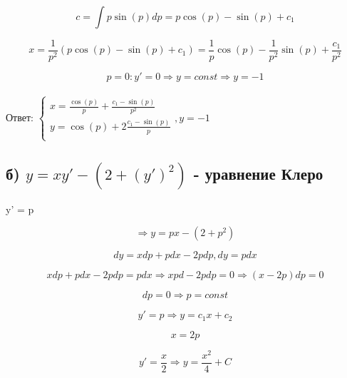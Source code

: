 \documentclass{article}
\begin{document}
\begin{equation*}
    c = \int{p\sin{(p)}dp} = p\cos{(p)} - \sin{(p)} + c_1
\end{equation*}

\begin{equation*}
    x = \frac{1}{p^2}(p\cos{(p)} - \sin{(p)} + c_1) = \frac{1}{p}\cos{(p)} - \frac{1}{p^2}\sin{(p)} + \frac{c_1}{p^2}
\end{equation*}

\begin{equation*}
    p = 0: y' = 0 \Rightarrow y = const \Rightarrow y = -1
\end{equation*}
\\
Ответ:
$
    \begin{cases}
    x = \frac{\cos{(p)}}{p} + \frac{c_1 - \sin{(p)}}{p^2} \\
    y = \cos{(p)} + 2\frac{c_1 - \sin{(p)}}{p} \\
    \end{cases} , y = -1
$
\subsection*{б) $y = xy' - (2 + (y')^2)$ - уравнение Клеро} 

   y' = p 

\begin{equation*}
   \Rightarrow  y = px - (2 + p^2)
\end{equation*}

\begin{equation*}
    dy = xdp + pdx - 2pdp,  dy = pdx
\end{equation*}

\begin{equation*}
    xdp +pdx - 2pdp = pdx \Rightarrow xpd - 2pdp = 0 \Rightarrow (x - 2p) dp = 0
\end{equation*}

\begin{equation*}
    dp = 0 \Rightarrow  p = const
\end{equation*}

\begin{equation*}
    y' = p \Rightarrow y = c_1x + c_2
\end{equation*}

\begin{equation*}
    x = 2p
\end{equation*}

\begin{equation*}
    y' = \frac{x}{2} \Rightarrow y = \frac{x^2}{4} + C
\end{equation*}
\end{document}
